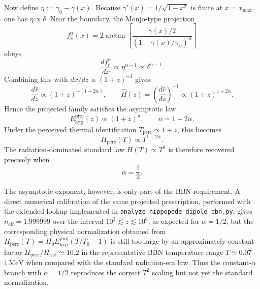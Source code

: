 \documentclass[11pt]{article}
\newcommand{\blue}[1]{{\color{blue}#1}}
\begin{document}
Now define $\eta:=\gamma_0-\gamma(x)$. Because $\gamma'(x)=1/\sqrt{1-x^2}$ is finite at $x=x_{\max}$, one has $\eta\propto\delta$. Near the boundary, the Monjo-type projection
\begin{equation}
f_{\hat r}^{\alpha}(x)=2\arctan\!\left[\frac{\gamma(x)/2}{(1-\gamma(x)/\gamma_U)^\alpha}\right]
\end{equation}
obeys
\begin{equation}
\frac{df_{\hat r}^{\alpha}}{dx}\propto \eta^{\alpha-1}\propto \delta^{\alpha-1}.
\end{equation}
Combining this with $dx/dz\propto (1+z)^{-3}$ gives
\begin{equation}
\frac{d\hat r}{dz}\propto (1+z)^{-(1+2\alpha)},
\qquad
\hat H(z)=\left(\frac{d\hat r}{dz}\right)^{-1}\propto (1+z)^{1+2\alpha}.
\end{equation}
Hence the projected family satisfies the asymptotic law
\begin{equation}
E_{\mathrm{hyp}}^{\mathrm{proj}}(z)\propto (1+z)^n,
\qquad n=1+2\alpha.
\end{equation}
Under the perceived thermal identification $T_{\mathrm{perc}}\propto 1+z$, this becomes
\begin{equation}
H_{\mathrm{perc}}(T)\propto T^{1+2\alpha}.
\end{equation}
The radiation-dominated standard law $H(T)\propto T^2$ is therefore recovered precisely when
\begin{equation}
\alpha=\frac12.
\end{equation}

\blue{The asymptotic exponent, however, is only part of the BBN requirement. A direct numerical calibration of the same projected prescription, performed with the extended lookup implemented in \texttt{analyze\_hippopede\_dipole\_bbn.py}, gives $n_{\mathrm{eff}}=1.999999$ over the interval $10^3\lesssim z\lesssim10^6$, as expected for $\alpha=1/2$, but the corresponding physical normalization obtained from $H_{\mathrm{perc}}(T)=H_0E_{\mathrm{hyp}}^{\mathrm{proj}}(T/T_0-1)$ is still too large by an approximately constant factor $H_{\mathrm{perc}}/H_{\mathrm{rad}}\simeq10.2$ in the representative BBN temperature range $T\simeq0.07$--$1\,\mathrm{MeV}$ when compared with the standard radiation-era law. Thus the constant-$\alpha$ branch with $\alpha=1/2$ reproduces the correct $T^2$ scaling but not yet the standard normalization.}
\end{document}
